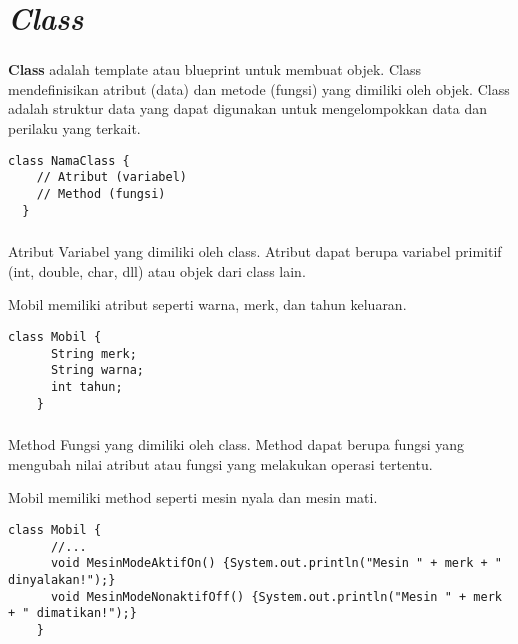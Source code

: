 \documentclass{../praktikum-ppt}
\begin{document}
  \section{\textit{Class}}
  \begin{frame}[fragile]
    \frametitle{\insertsection}
    \begin{definisi}
      \textbf{Class} adalah template atau blueprint untuk membuat objek. Class mendefinisikan atribut (data) dan metode (fungsi) yang dimiliki oleh objek. Class adalah struktur data yang dapat digunakan untuk mengelompokkan data dan perilaku yang terkait.
    \end{definisi}
    \begin{lstlisting}[caption={Struktur Dasar Class}]
  class NamaClass {
    // Atribut (variabel)
    // Method (fungsi)
  }
    \end{lstlisting}
  \end{frame}

  \begin{frame}[fragile]
    \frametitle{\insertsection}
    \begin{block}{Atribut}
      Variabel yang dimiliki oleh class. Atribut dapat berupa variabel primitif (int, double, char, dll) atau objek dari class lain.
    \end{block}
    \begin{contoh}
      Mobil memiliki atribut seperti warna, merk, dan tahun keluaran.
    \end{contoh}
    \begin{lstlisting}[caption={Contoh Penambahan Atribut pada}]
    class Mobil {
      String merk;
      String warna;
      int tahun;
    }
    \end{lstlisting}
  \end{frame}

  \begin{frame}[fragile]
    \frametitle{\insertsection}
    \begin{block}{Method}
      Fungsi yang dimiliki oleh class. Method dapat berupa fungsi yang mengubah nilai atribut atau fungsi yang melakukan operasi tertentu.
    \end{block}
    \begin{contoh}
      Mobil memiliki method seperti mesin nyala dan mesin mati.
    \end{contoh}
    \begin{lstlisting}[caption={Contoh Penambahan Method pada Class Mobil}]
    class Mobil {
      //...
      void MesinModeAktifOn() {System.out.println("Mesin " + merk + " dinyalakan!");}
      void MesinModeNonaktifOff() {System.out.println("Mesin " + merk + " dimatikan!");}
    }
    \end{lstlisting}
  \end{frame}
\end{document}
